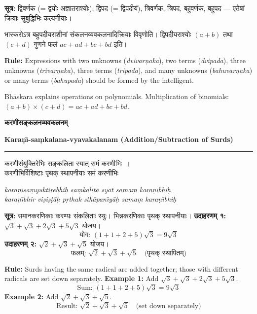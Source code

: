 \documentclass[11pt,a4paper]{article}
\newcommand{\dev}[1]{{\devanagarifont #1}}
\newcommand{\bicol}[2]{%
\noindent%
\begin{minipage}[t]{0.48\textwidth}
\begin{flushleft}
\small
#1
\end{flushleft}
\end{minipage}%
\hfill%
\begin{minipage}[t]{0.48\textwidth}
\begin{flushleft}
\small
#2
\end{flushleft}
\end{minipage}%
\vspace{0.4em}
}
\newcommand{\bicolverse}[2]{%
\par\noindent%
\begin{minipage}[t]{0.48\textwidth}
\centering
\color{versecolor}
\devanagarifont
\small
#1
\end{minipage}%
\hfill%
\begin{minipage}[t]{0.48\textwidth}
\centering
\color{versecolor}
\small
#2
\end{minipage}%
\par\vspace{0.4em}
}
\newcommand{\sectionbicol}[2]{%
\vspace{0.5em}
\noindent%
\begin{minipage}[t]{0.48\textwidth}
\begin{center}
\large\bfseries\color{sectioncolor}
\dev{#1}
\end{center}
\end{minipage}%
\hfill%
\begin{minipage}[t]{0.48\textwidth}
\begin{center}
\large\bfseries\color{sectioncolor}
#2
\end{center}
\end{minipage}%
\vspace{0.3em}
\noindent\rule{\textwidth}{0.4pt}
}
\begin{document}
\vspace{0.5cm}

\bicol{%
\textbf{सूत्र:} द्विवर्णक (= द्वयोः अज्ञातराश्योः), द्विपद (= द्विपदीयं), त्रिवर्णक, त्रिपद, बहुवर्णक, बहुपद --- एतेषां क्रियाः सुबुद्धिभिः कल्पनीयाः।
\vspace{0.3cm}

भास्करोऽत्र बहुपदीयराशीनां संकलनव्यवकलनादिक्रियाः विवृणोति। द्विपदीयराश्योः $(a+b)$ तथा $(c+d)$ गुणने फलं $ac + ad + bc + bd$ इति।
}{%
\textbf{Rule:} Expressions with two unknowns (\textit{dvivar\d{n}aka}), two terms (\textit{dvipada}), three unknowns (\textit{trivar\d{n}aka}), three terms (\textit{tripada}), and many unknowns (\textit{bahuvar\d{n}aka}) or many terms (\textit{bahupada}) should be formed by the intelligent.
\vspace{0.3cm}

Bh\={a}skara explains operations on polynomials. Multiplication of binomials: $(a+b) \times (c+d) = ac + ad + bc + bd$.
}

\clearpage

\sectionbicol{करणीसङ्कलनव्यवकलनम्}{Kara\d{n}\={\i}-sa\d{m}kalana-vyavakalanam (Addition/Subtraction of Surds)}

\vspace{0.3cm}

\bicolverse{%
करणीसंयुक्तिरेभिः सङ्कलिता स्यात् समं करणीभिः~।\\
करणीभिर्विशिष्टाः पृथक् स्थापनीयाः समं करणीभिः~
}{%
\textit{kara\d{n}\={\i}sa\d{m}yuktirebhi\d{h} sa\d{m}kalit\={a} sy\={a}t sama\d{m} kara\d{n}\={\i}bhi\d{h}}\\
\textit{kara\d{n}\={\i}bhir vi\d{s}i\d{s}\d{t}\={a}\d{h} p\d{r}thak sth\={a}pan\={\i}y\={a}\d{h} sama\d{m} kara\d{n}\={\i}bhi\d{h}}
}

\vspace{0.5cm}

\bicol{%
\textbf{सूत्र:} समानकरणिकाः करण्यः संकलिताः स्युः। भिन्नकरणिकाः पृथक् स्थापनीयाः।
\vspace{0.3cm}
\textbf{उदाहरणम् १:} $\sqrt{3} + \sqrt{3} + 2\sqrt{3} + 5\sqrt{3}$ योजय।
\[\text{योग: } (1+1+2+5)\sqrt{3} = 9\sqrt{3}\]
\textbf{उदाहरणम् २:} $\sqrt{2} + \sqrt{3} + \sqrt{5}$ योजय।
\[\text{फलम्: } \sqrt{2} + \sqrt{3} + \sqrt{5} \quad \text{(पृथक् स्थापितम्)}\]
}{%
\textbf{Rule:} Surds having the same radical are added together; those with different radicals are set down separately.
\vspace{0.3cm}
\textbf{Example 1:} Add $\sqrt{3} + \sqrt{3} + 2\sqrt{3} + 5\sqrt{3}$.
\[\text{Sum: } (1+1+2+5)\sqrt{3} = 9\sqrt{3}\]
\textbf{Example 2:} Add $\sqrt{2} + \sqrt{3} + \sqrt{5}$.
\[\text{Result: } \sqrt{2} + \sqrt{3} + \sqrt{5} \quad \text{(set down separately)}\]
}
\end{document}
